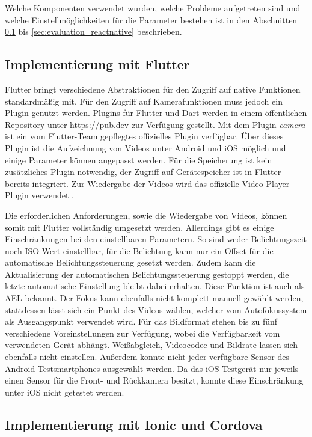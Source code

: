 Welche Komponenten verwendet wurden, welche Probleme aufgetreten sind und welche Einstellmöglichkeiten für die Parameter bestehen ist in den Abschnitten \ref{sec:evaluation_flutter} bis \ref{sec:evaluation_reactnative} beschrieben.

\subsection{Implementierung mit Flutter}
\label{sec:evaluation_flutter}

Flutter bringt verschiedene Abstraktionen für den Zugriff auf native Funktionen standardmäßig mit.
Für den Zugriff auf Kamerafunktionen muss jedoch ein Plugin genutzt werden.
Plugins für Flutter und Dart werden in einem öffentlichen Repository unter \url{https://pub.dev} zur Verfügung gestellt.
Mit dem Plugin \textit{camera} \cite{Dart_Camera} ist ein vom Flutter-Team gepflegtes offizielles Plugin verfügbar. 
Über dieses Plugin ist die Aufzeichnung von Videos unter Android und iOS möglich und einige Parameter können angepasst werden.
Für die Speicherung ist kein zusätzliches Plugin notwendig, der Zugriff auf Gerätespeicher ist in Flutter bereits integriert.
Zur Wiedergabe der Videos wird das offizielle Video-Player-Plugin verwendet \cite{Dart_Video}.

Die erforderlichen Anforderungen, sowie die Wiedergabe von Videos, können somit mit Flutter vollständig umgesetzt werden.
Allerdings gibt es einige Einschränkungen bei den einstellbaren Parametern.
So sind weder Belichtungszeit noch ISO-Wert einstellbar, für die Belichtung kann nur ein Offset für die automatische Belichtungssteuerung gesetzt werden.
Zudem kann die Aktualisierung der automatischen Belichtungssteuerung gestoppt werden, die letzte automatische Einstellung bleibt dabei erhalten.
Diese Funktion ist auch als \ac{AEL} bekannt.
Der Fokus kann ebenfalls nicht komplett manuell gewählt werden, stattdessen lässt sich ein Punkt des Videos wählen, welcher vom Autofokussystem als Ausgangspunkt verwendet wird.
Für das Bildformat stehen bis zu fünf verschiedene Voreinstellungen zur Verfügung, wobei die Verfügbarkeit vom verwendeten Gerät abhängt.
Weißabgleich, Videocodec und Bildrate lassen sich ebenfalls nicht einstellen.
Außerdem konnte nicht jeder verfügbare Sensor des Android-Testsmartphones ausgewählt werden.
Da das iOS-Testgerät nur jeweils einen Sensor für die Front- und Rückkamera besitzt, konnte diese Einschränkung unter iOS nicht getestet werden.


\subsection{Implementierung mit Ionic und Cordova}
\label{sec:evaluation_ionic}


